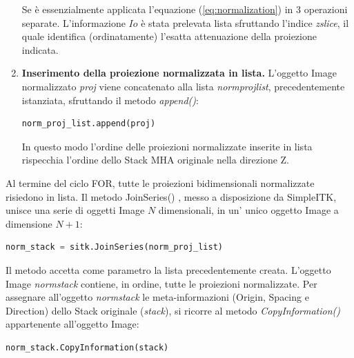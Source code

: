 \documentclass[a4paper,12pt, doubleside]{report}
\begin{document}
\begin{enumerate}
                    Se è essenzialmente applicata l'equazione (\ref{eq:normalization}) in 3 operazioni separate. L'informazione $Io$ è stata prelevata lista sfruttando l'indice \textit{zslice}, il quale identifica (ordinatamente) l'esatta attenuazione della proiezione indicata.
                    
                    \item \textbf{Inserimento della proiezione normalizzata in lista.} L'oggetto Image normalizzato \textit{proj} viene concatenato alla lista \textit{norm\textunderscore proj\textunderscore list}, precedentemente istanziata, sfruttando il metodo \textit{append()}:
                    
                    \begin{lstlisting}[language=python, frame=bt]
norm_proj_list.append(proj)
                    \end{lstlisting}
                    
                    In questo modo l'ordine delle proiezioni normalizzate inserite in lista rispecchia l'ordine dello Stack MHA originale nella direzione Z.
                \end{enumerate}
                
                Al termine del ciclo FOR, tutte le proiezioni bidimensionali normalizzate risiedono in lista. Il metodo JoinSeries() \cite{sitk-joinseries}, messo a disposizione da SimpleITK, unisce una serie di oggetti Image $N$ dimensionali, in un' unico oggetto Image a dimensione $N+1$:
                
                \begin{lstlisting}[language=python, frame=bt]
norm_stack = sitk.JoinSeries(norm_proj_list)
                \end{lstlisting}
                    
                Il metodo accetta come parametro la lista precedentemente creata. L'oggetto Image \textit{norm\textunderscore stack} contiene, in ordine, tutte le proiezioni normalizzate. Per assegnare all'oggetto \textit{norm\textunderscore stack} le meta-informazioni (Origin, Spacing e Direction) dello Stack originale (\textit{stack}), si ricorre al metodo \textit{CopyInformation()} \cite{sitk-copy-information} appartenente all'oggetto Image:
                
                \begin{lstlisting}[language=python, frame=bt]
norm_stack.CopyInformation(stack)
                \end{lstlisting}
                
\end{document}
